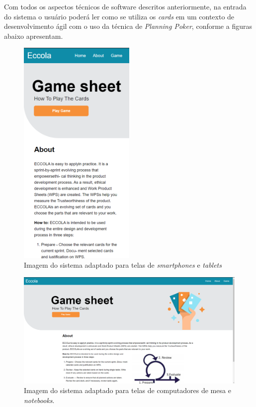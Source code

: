 Com todos os aspectos técnicos de software descritos anteriormente, na entrada do sistema o usuário poderá ler como se utiliza os \textit{cards} em um contexto de desenvolvimento ágil com o uso da técnica de \textit{Planning Poker}, conforme a figuras abaixo apresentam.

\begin{figure}[h!]
    \centering
    \includegraphics[width=0.5\textwidth]{img/eccola_celular.png}
    \caption{Imagem do sistema adaptado para telas de \textit{smartphones} e \textit{tablets}}
    \label{fig:eccola_celular}
\end{figure}

\begin{figure}[h!]
    \centering
    \includegraphics[width=\textwidth]{img/eccola_desktop.png}
    \caption{Imagem do sistema adaptado para telas de computadores de mesa e \textit{notebooks}.}
    \label{fig:eccola_desktop}
\end{figure}

